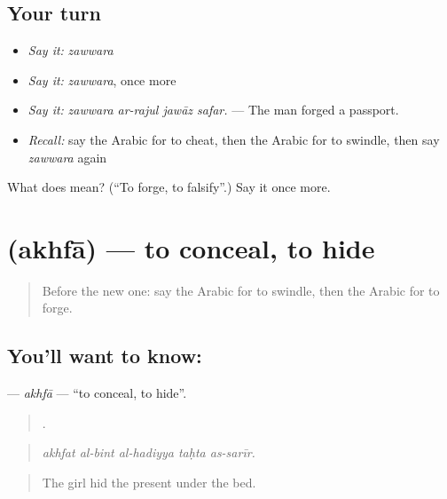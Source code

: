 \subsection*{Your turn}
\begin{itemize}
\raggedright
  \item \emph{Say it:} \emph{zawwara}
  \item \emph{Say it:} \emph{zawwara}, once more
  \item \emph{Say it:} \emph{zawwara ar-rajul jawāz safar.} — The man forged a passport.
  \item \emph{Recall:} say the Arabic for to cheat, then the Arabic for to swindle, then say \emph{zawwara} again
\end{itemize}

\begin{tcolorbox}[breakable,colback=teal!4,colframe=teal!35!black,title={Before you move on}]
What does  mean? (\textquotedblleft{}To forge, to falsify\textquotedblright{}.) Say it once more.
\end{tcolorbox}
\section[\texorpdfstring{\ar{أخفى} (akhfā)}{أخفى (akhfā)}]{ (akhfā) — to conceal, to hide}

\label{lesson:AR-C351-akhfa}



\begin{quote}
Before the new one: say the Arabic for to swindle, then the Arabic for to forge.
\end{quote}

\subsection*{You'll want to know: }
\textbf{} — \emph{akhfā} — \textquotedblleft{}to conceal, to hide\textquotedblright{}.

\begin{quote}
    .
\end{quote}

\begin{quote}
\emph{akhfat al-bint al-hadiyya taḥta as-sarīr.}
\end{quote}

\begin{quote}
The girl hid the present under the bed.
\end{quote}

